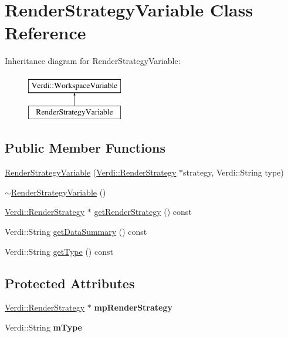 \hypertarget{class_render_strategy_variable}{\section{\-Render\-Strategy\-Variable \-Class \-Reference}
\label{class_render_strategy_variable}
}
\-Inheritance diagram for \-Render\-Strategy\-Variable\-:\begin{figure}[H]
\begin{center}
\leavevmode
\includegraphics[height=2.000000cm]{class_render_strategy_variable}
\end{center}
\end{figure}
\subsection*{\-Public \-Member \-Functions}
\begin{DoxyCompactItemize}
\item 
\hyperlink{class_render_strategy_variable_af981bc6623d27c9523327c575e93aa42}{\-Render\-Strategy\-Variable} (\hyperlink{class_verdi_1_1_render_strategy}{\-Verdi\-::\-Render\-Strategy} $\ast$strategy, \-Verdi\-::\-String type)
\item 
\hyperlink{class_render_strategy_variable_ad197f1dcf6075d805b294c9001477bd1}{$\sim$\-Render\-Strategy\-Variable} ()
\item 
\hyperlink{class_verdi_1_1_render_strategy}{\-Verdi\-::\-Render\-Strategy} $\ast$ \hyperlink{class_render_strategy_variable_a804b82417f305c3aa7f314b757377d66}{get\-Render\-Strategy} () const 
\item 
\-Verdi\-::\-String \hyperlink{class_render_strategy_variable_a77130948ca7d7fd32cf7ebf3094f13b5}{get\-Data\-Summary} () const 
\item 
\-Verdi\-::\-String \hyperlink{class_render_strategy_variable_a8dd612d977dc62f3c67c413dd2005770}{get\-Type} () const 
\end{DoxyCompactItemize}
\subsection*{\-Protected \-Attributes}
\begin{DoxyCompactItemize}
\item 
\hypertarget{class_render_strategy_variable_a0a7e75d3c63248467bf129bbacd1e4ee}{\hyperlink{class_verdi_1_1_render_strategy}{\-Verdi\-::\-Render\-Strategy} $\ast$ {\bfseries mp\-Render\-Strategy}}\label{class_render_strategy_variable_a0a7e75d3c63248467bf129bbacd1e4ee}

\item 
\hypertarget{class_render_strategy_variable_ace40463a437b64230bf4fef3672735ed}{\-Verdi\-::\-String {\bfseries m\-Type}}\label{class_render_strategy_variable_ace40463a437b64230bf4fef3672735ed}

\end{DoxyCompactItemize}



